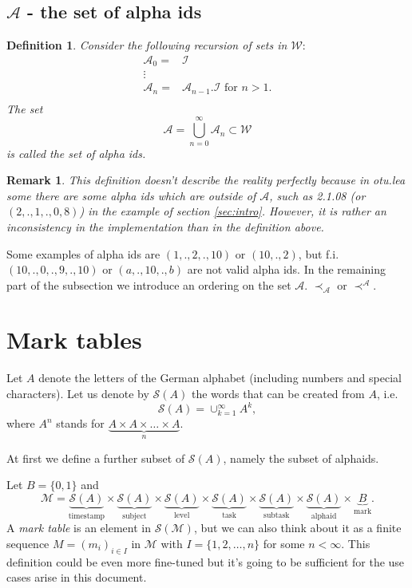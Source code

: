 \documentclass{scrartcl}
\newtheorem{mydef}{Definition}
\newtheorem{remark}{Remark}
\begin{document}
\subsection{$\mathcal{A}$ - the set of alpha ids}
\begin{mydef}
Consider the following recursion of sets in $\mathcal{W}:$
\begin{equation}
\begin{split}
\mathcal{A}_0= & \mathcal{I}\\
\vdots &\\
\mathcal{A}_{n} = &\mathcal{A}_{n-1}.\mathcal{I} \mbox{ for } n>1.\\
\end{split}
\end{equation}
The set $$\mathcal{A}=\bigcup_{n=0}^{\infty}\mathcal{A}_n\subset\mathcal{W}$$ is called the \emph{set of alpha ids}. 
\end{mydef}

\begin{remark}
This definition doesn't describe the reality perfectly because in otu.lea some there are some alpha ids which are outside of $\mathcal{A}$, such as 2.1.08 (or $(2,.,1,.,0,8)$) in the example of section \ref{sec:intro}. However, it is rather an inconsistency in the implementation than in the definition above.
\end{remark}

Some examples of alpha ids are $(1,.,2,.,10)$ or $(10,.,2)$, but f.i. $(10,.,0,.,9,.,10)$ or $(a,.,10,.,b)$ are not valid alpha ids. In the remaining part of the subsection we introduce an ordering on the set $\mathcal{A}$. $\prec_{\mathcal{A}}$ or $\prec^{\mathcal{A}}$.


\section{Mark tables}
Let $A$ denote the letters of the German alphabet (including numbers and special characters). Let us denote by $\mathcal{S}(A)$ the words that can be created from $A$, i.e.
$$\mathcal{S}(A)=\cup_{k=1}^{\infty}A^k,$$
where $A^n$ stands for $\underbrace{A\times A\times\ldots \times A}_{n}$. 

At first we define a further subset of $\mathcal{S}(A)$, namely the subset of alphaids.

Let $B=\{0,1\}$ and $$\mathcal{M}=\underbrace{\mathcal{S}(A)}_{\mbox{timestamp}}\times\underbrace{\mathcal{S}(A)}_{\mbox{subject}}\times\underbrace{\mathcal{S}(A)}_{\mbox{level}}\times\underbrace{\mathcal{S}(A)}_{\mbox{task}}\times\underbrace{\mathcal{S}(A)}_{\mbox{subtask}}\times\underbrace{\mathcal{S}(A)}_{\mbox{alphaid}}\times \underbrace{B}_{\mbox{mark}}.$$ A \emph{mark table} is an element in $\mathcal{S}(\mathcal{M})$, but we can also think about it as a finite sequence $M=(m_i)_{i\in I}$ in $\mathcal{M}$ with $I=\{1,2,\ldots,n\}$ for some $n<\infty$. This definition could be even more fine-tuned but it's going to be sufficient for the use cases arise in this document.
\end{document}
